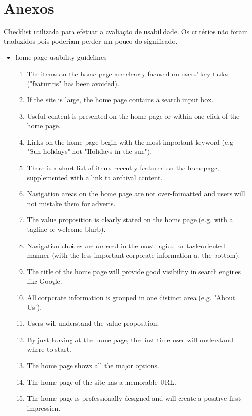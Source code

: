 \chapter{Anexos}

Checklist utilizada para efetuar a avaliação de usabilidade. Os critérios não foram traduzidos pois poderiam perder um pouco do significado.

\begin{itemize}
  \item home page usability guidelines
      \begin{enumerate}
        \item The items on the home page are clearly focused on users' key tasks ("featuritis" has been avoided).
        \item If the site is large, the home page contains a search input box.
        \item Useful content is presented on the home page or within one click of the home page.
        \item Links on the home page begin with the most important keyword (e.g. "Sun holidays" not "Holidays in the sun").
        \item There is a short list of items recently featured on the homepage, supplemented with a link to archival content.
        \item Navigation areas on the home page are not over-formatted and users will not mistake them for adverts.
        \item The value proposition is clearly stated on the home page (e.g. with a tagline or welcome blurb).
        \item Navigation choices are ordered in the most logical or task-oriented manner (with the less important corporate information at the bottom).
        \item The title of the home page will provide good visibility in search engines like Google.
        \item All corporate information is grouped in one distinct area (e.g. "About Us").
        \item Users will understand the value proposition.
        \item By just looking at the home page, the first time user will understand where to start.
        \item The home page shows all the major options.
        \item The home page of the site has a memorable URL.
        \item The home page is professionally designed and will create a positive first impression.

\end{enumerate}
\end{itemize}
